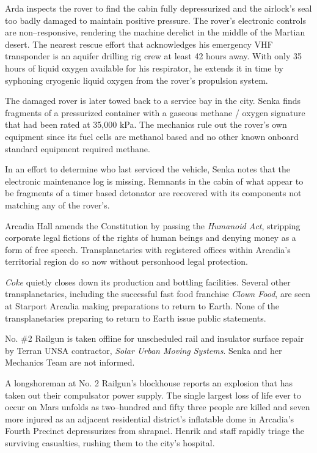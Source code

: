 Arda inspects the rover to find the cabin fully depressurized and the airlock's seal too badly damaged to maintain positive pressure. The rover's electronic controls are non--responsive, rendering the machine derelict in the middle of the Martian desert. The nearest rescue effort that acknowledges his emergency VHF transponder is an aquifer drilling rig crew at least 42 hours away. With only 35 hours of liquid oxygen available for his respirator, he extends it in time by syphoning cryogenic liquid oxygen from the rover's propulsion system.

The damaged rover is later towed back to a service bay in the city. Senka finds fragments of a pressurized container with a gaseous methane / oxygen signature that had been rated at 35,000 kPa. The mechanics rule out the rover's own equipment since its fuel cells are methanol based and no other known onboard standard equipment required methane. 

In an effort to determine who last serviced the vehicle, Senka notes that the electronic maintenance log is missing. Remnants in the cabin of what appear to be fragments of a timer based detonator are recovered with its components not matching any of the rover's.
\StopTimelineDate

Arcadia Hall amends the Constitution by passing the {\it Humanoid Act}, stripping corporate legal fictions of the rights of human beings and denying money as a form of free speech. Transplanetaries with registered offices within Arcadia's territorial region do so now without personhood legal protection.
\StopTimelineDate

{\it Coke} quietly closes down its production and bottling facilities. Several other transplanetaries, including the successful fast food franchise {\it Clown Food}, are seen at Starport Arcadia making preparations to return to Earth. None of the transplanetaries preparing to return to Earth issue public statements.
\StopTimelineDate

No. \#2 Railgun is taken offline for unscheduled rail and insulator surface repair by Terran UNSA contractor, {\it Solar Urban Moving Systems}. Senka and her Mechanics Team are not informed.
\StopTimelineDate

A longshoreman at No. \type{#}2 Railgun's blockhouse reports an explosion that has taken out their compulsator power supply. The single largest loss of life ever to occur on Mars unfolds as two--hundred and fifty three people are killed and seven more injured as an adjacent residential district's inflatable dome in Arcadia's Fourth Precinct depressurizes from shrapnel. Henrik and staff rapidly triage the surviving casualties, rushing them to the city's hospital.

